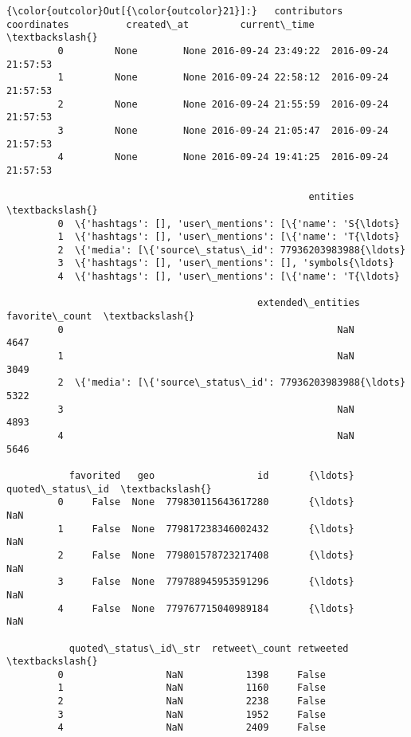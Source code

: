 \documentclass[11pt]{article}
\begin{document}
            \begin{Verbatim}[commandchars=\\\{\}]
{\color{outcolor}Out[{\color{outcolor}21}]:}   contributors coordinates          created\_at         current\_time  \textbackslash{}
         0         None        None 2016-09-24 23:49:22  2016-09-24 21:57:53   
         1         None        None 2016-09-24 22:58:12  2016-09-24 21:57:53   
         2         None        None 2016-09-24 21:55:59  2016-09-24 21:57:53   
         3         None        None 2016-09-24 21:05:47  2016-09-24 21:57:53   
         4         None        None 2016-09-24 19:41:25  2016-09-24 21:57:53   
         
                                                     entities  \textbackslash{}
         0  \{'hashtags': [], 'user\_mentions': [\{'name': 'S{\ldots}   
         1  \{'hashtags': [], 'user\_mentions': [\{'name': 'T{\ldots}   
         2  \{'media': [\{'source\_status\_id': 77936203983988{\ldots}   
         3  \{'hashtags': [], 'user\_mentions': [], 'symbols{\ldots}   
         4  \{'hashtags': [], 'user\_mentions': [\{'name': 'T{\ldots}   
         
                                            extended\_entities  favorite\_count  \textbackslash{}
         0                                                NaN            4647   
         1                                                NaN            3049   
         2  \{'media': [\{'source\_status\_id': 77936203983988{\ldots}            5322   
         3                                                NaN            4893   
         4                                                NaN            5646   
         
           favorited   geo                  id       {\ldots}        quoted\_status\_id  \textbackslash{}
         0     False  None  779830115643617280       {\ldots}                     NaN   
         1     False  None  779817238346002432       {\ldots}                     NaN   
         2     False  None  779801578723217408       {\ldots}                     NaN   
         3     False  None  779788945953591296       {\ldots}                     NaN   
         4     False  None  779767715040989184       {\ldots}                     NaN   
         
           quoted\_status\_id\_str  retweet\_count retweeted  \textbackslash{}
         0                  NaN           1398     False   
         1                  NaN           1160     False   
         2                  NaN           2238     False   
         3                  NaN           1952     False   
         4                  NaN           2409     False   
         

\end{Verbatim}
\end{document}
